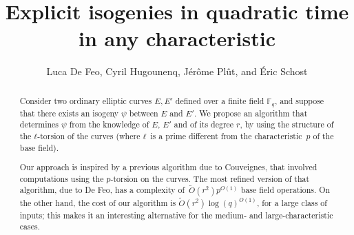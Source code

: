 \documentclass{lms}
\title[Explicit isogenies in any characteristic]{Explicit isogenies in quadratic time in any characteristic}
\author[L. De Feo, C. Hugounenq, J. Plût, É. Schost]%
  {Luca De Feo, Cyril Hugounenq, Jérôme Plût, and Éric Schost}
\newcommand{\F}{\mathbb{F}}
\newcommand{\tildO}{\tilde{O}}
\begin{document}
\maketitle

\begin{abstract}
  Consider two ordinary elliptic curves $E,E'$ defined over a finite field
  $\F_q$, and suppose that there exists an isogeny $\psi$ between $E$
  and $E'$.  We propose an algorithm that determines $\psi$ from the
  knowledge of $E$, $E'$ and of its degree $r$, by using the
  structure of the $ℓ$-torsion of the curves (where $ℓ$~is a prime
  different from the characteristic~$p$ of the base field).  

  Our approach is inspired by a previous algorithm due to Couveignes,
  that involved computations using the $p$-torsion on the curves. 
  The most refined version of that algorithm, due to De Feo, 
  has a complexity of~$\tildO(r^2) p^{O(1)}$ base field operations.
  On the other hand, the cost of our algorithm is $\tildO(r^2) \log(q)^{O(1)}$,
  for a large class of inputs; this makes it an interesting alternative
  for the medium- and large-characteristic cases.
\end{abstract}



\end{document}
